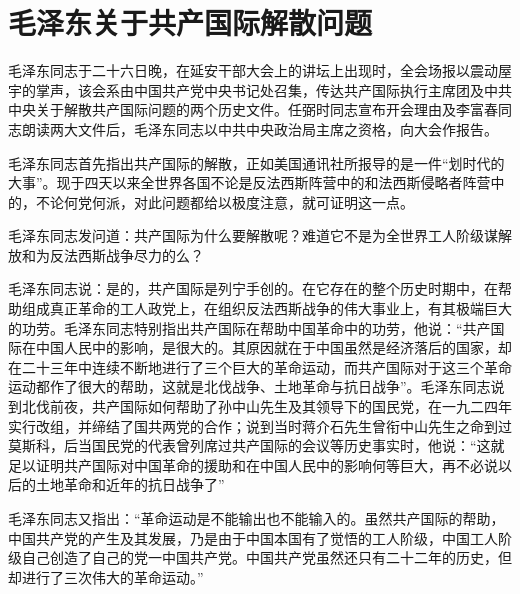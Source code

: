 \section[毛泽东关于共产国际解散问题（一九四三年五月二十六日）]{毛泽东关于共产国际解散问题}


毛泽东同志于二十六日晚，在延安干部大会上的讲坛上出现时，全会场报以震动屋宇的掌声，该会系由中国共产党中央书记处召集，传达共产国际执行主席团及中共中央关于解散共产国际问题的两个历史文件。任弼时同志宣布开会理由及李富春同志朗读两大文件后，毛泽东同志以中共中央政治局主席之资格，向大会作报告。

毛泽东同志首先指出共产国际的解散，正如美国通讯社所报导的是一件“划时代的大事”。现于四天以来全世界各国不论是反法西斯阵营中的和法西斯侵略者阵营中的，不论何党何派，对此问题都给以极度注意，就可证明这一点。

毛泽东同志发问道：共产国际为什么要解散呢？难道它不是为全世界工人阶级谋解放和为反法西斯战争尽力的么？

毛泽东同志说：是的，共产国际是列宁手创的。在它存在的整个历史时期中，在帮助组成真正革命的工人政党上，在组织反法西斯战争的伟大事业上，有其极端巨大的功劳。毛泽东同志特别指出共产国际在帮助中国革命中的功劳，他说：“共产国际在中国人民中的影响，是很大的。其原因就在于中国虽然是经济落后的国家，却在二十三年中连续不断地进行了三个巨大的革命运动，而共产国际对于这三个革命运动都作了很大的帮助，这就是北伐战争、土地革命与抗日战争”。毛泽东同志说到北伐前夜，共产国际如何帮助了孙中山先生及其领导下的国民党，在一九二四年实行改组，并缔结了国共两党的合作；说到当时蒋介石先生曾衔中山先生之命到过莫斯科，后当国民党的代表曾列席过共产国际的会议等历史事实时，他说：“这就足以证明共产国际对中国革命的援助和在中国人民中的影响何等巨大，再不必说以后的土地革命和近年的抗日战争了”

毛泽东同志又指出：“革命运动是不能输出也不能输入的。虽然共产国际的帮助，中国共产党的产生及其发展，乃是由于中国本国有了觉悟的工人阶级，中国工人阶级自己创造了自己的党一中国共产党。中国共产党虽然还只有二十二年的历史，但却进行了三次伟大的革命运动。”

